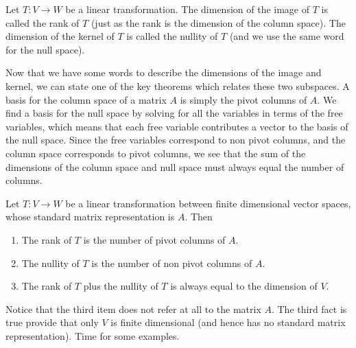 \begin{definition} 
Let $T:V\to W$ be a linear transformation. 
The dimension of the image of $T$ is called the rank of $T$ (just as the rank is the dimension of the column space).
The dimension of the kernel of $T$ is called the nullity of $T$ (and we use the same word for the null space). 

\end{definition}

Now that we have some words to describe the dimensions of the image and kernel, we can state one of the key theorems which relates these two subspaces.  A basis for the column space of a matrix $A$ is simply the pivot columns of $A$. We find a basis for the null space by solving for all the variables in terms of the free variables, which means that each free variable contributes a vector to the basis of the null space.  Since the free variables correspond to non pivot columns, and the column space corresponds to pivot columns, we see that the sum of the dimensions of the column space and null space must always equal the number of columns.  

\begin{theorem}
Let $T:V\to W$ be a linear transformation between finite dimensional vector spaces, whose standard matrix representation is $A$.  Then 
\begin{enumerate}
	\item The rank of $T$ is the number of pivot columns of $A$. 
	\item The nullity of $T$ is the number of non pivot columns of $A$. 
	\item The rank of $T$ plus the nullity of $T$ is always equal to the dimension of $V$. 
\end{enumerate}
\end{theorem}

Notice that the third item does not refer at all to the matrix $A$.  The third fact is true provide that only $V$ is finite dimensional (and hence has no standard matrix representation). Time for some examples.


